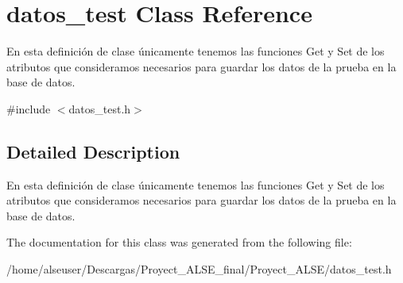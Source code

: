\hypertarget{classdatos__test}{}\section{datos\+\_\+test Class Reference}
\label{classdatos__test}


En esta definición de clase únicamente tenemos las funciones Get y Set de los atributos que consideramos necesarios para guardar los datos de la prueba en la base de datos.  




{\ttfamily \#include $<$datos\+\_\+test.\+h$>$}



\subsection{Detailed Description}
En esta definición de clase únicamente tenemos las funciones Get y Set de los atributos que consideramos necesarios para guardar los datos de la prueba en la base de datos. 

The documentation for this class was generated from the following file\+:\begin{DoxyCompactItemize}
\item 
/home/alseuser/\+Descargas/\+Proyect\+\_\+\+A\+L\+S\+E\+\_\+final/\+Proyect\+\_\+\+A\+L\+S\+E/datos\+\_\+test.\+h\end{DoxyCompactItemize}
